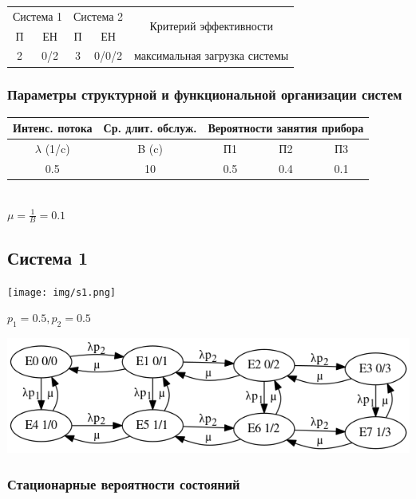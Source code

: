 \begin{tabular}{|c|c|c|c|c|}
\hline
\multicolumn{2}{|c|}{Система 1} & \multicolumn{2}{c|}{Система 2} & \multirow{2}{*}{Критерий эффективности} \\ \cline{1-4}
П             & ЕН              & П            & ЕН              &                                         \\ \hline
2             & 0/2             & 3            & 0/0/2           & максимальная загрузка системы           \\ \hline
\end{tabular}

\subsubsection{Параметры структурной и функциональной организации систем}

\begin{tabular}{|c|c|c|c|c|}
\hline
Интенс. потока  & Ср. длит. обслуж. & \multicolumn{3}{c|}{Вероятности занятия прибора} \\ \hline
$\lambda$ (1/c) & B (c)             & П1             & П2             & П3             \\ \hline
0.5             & 10                & 0.5            & 0.4            & 0.1            \\ \hline
\end{tabular}
\\

$\mu = \frac{1}{B} = 0.1$

\newpage
\subsection{Система 1}
\texttt{[image: img/s1.png]}

$p_1 = 0.5, p_2 = 0.5$

\includegraphics[resolution=128]{img/g1.png}

\subsubsection{Стационарные вероятности состояний}

